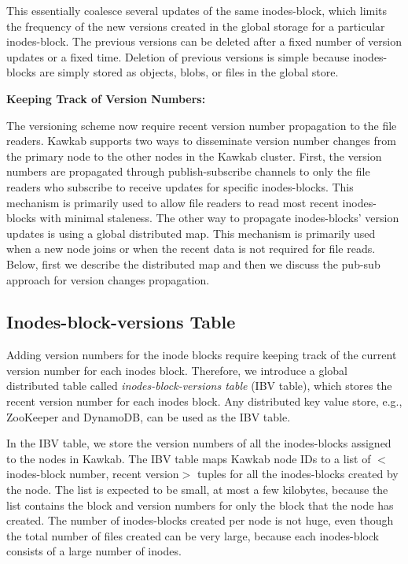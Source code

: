 \documentclass[]{article}
\newcommand{\subtopic}[1]{\vspace{1.5pt} \noindent \textbf{#1}}
\begin{document}
This essentially coalesce several updates of the same inodes-block, which limits
the frequency of the new versions created in the global storage for a particular
inodes-block. The previous versions can be deleted after a fixed number of
version updates or a fixed time. Deletion of previous versions is simple
because inodes-blocks are simply stored as objects, blobs, or files in the
global store.


\subtopic{Keeping Track of Version Numbers:}

The versioning scheme now require recent version number propagation to the file
readers. Kawkab supports two ways to disseminate version number changes from
the primary node to the other nodes in the Kawkab cluster. First, the version
numbers are propagated through publish-subscribe channels to only the file
readers who subscribe to receive updates for specific inodes-blocks.  This
mechanism is primarily used to allow file readers to read most recent
inodes-blocks with minimal staleness. The other way to propagate inodes-blocks'
version updates is using a global distributed map. This mechanism is primarily
used when a new node joins or when the recent data is not required for file
reads. Below, first we describe the distributed map and then we discuss the
pub-sub approach for version changes propagation.

\subsection{Inodes-block-versions Table}

Adding version numbers for the inode blocks require keeping track of the
current version number for each inodes block. Therefore, we introduce a global
distributed table called \textit{inodes-block-versions table} (IBV table),
which  stores the recent version number for each inodes block. Any distributed
key value store, e.g., ZooKeeper and DynamoDB, can be used as the IBV table. 

In the IBV table, we store the version numbers of all the inodes-blocks
assigned to the nodes in Kawkab. The IBV table maps Kawkab node IDs to a list
of $<$inodes-block number, recent version$>$ tuples for all the inodes-blocks
created by the node. The list is expected to be small, at most a few kilobytes, 
because the list
contains the block and version numbers for only the block that the node
has created.  The number of inodes-blocks created per node is not huge, 
even though the total number of files created can be very large,
because each inodes-block consists of a large number of inodes. 
\end{document}
